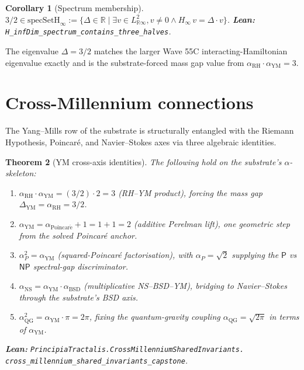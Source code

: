 \documentclass[11pt,a4paper]{article}
\theoremstyle{plain}
\newtheorem{theorem}{Theorem}[section]
\newtheorem{corollary}[theorem]{Corollary}
\theoremstyle{definition}
\begin{document}
\begin{corollary}[Spectrum membership]
\label{cor:spectrum}
$3/2 \in \mathrm{specSetH}_{\infty} :=
\{\Delta \in \mathbb{R} \mid \exists v \in L^{2}_{\mathbb{R}\infty},
v \ne 0 \wedge H_{\infty}\,v = \Delta \cdot v\}$.
\textbf{Lean:}
\texttt{H\_infDim\_spectrum\_contains\_three\_halves}.
\end{corollary}

The eigenvalue $\Delta = 3/2$ matches the larger Wave 55C
interacting-Hamiltonian eigenvalue exactly and is the
substrate-forced mass gap value from
$\alpha_{\mathrm{RH}} \cdot \alpha_{\mathrm{YM}} = 3$.

\section{Cross-Millennium connections}

The Yang--Mills row of the substrate is structurally entangled
with the Riemann Hypothesis, Poincar\'e, and Navier--Stokes axes
via three algebraic identities.

\begin{theorem}[YM cross-axis identities]
\label{thm:crossaxis}
The following hold on the substrate's $\alpha$-skeleton:
\begin{enumerate}[label=(\textbf{C\arabic*}),leftmargin=*]
\item $\alpha_{\mathrm{RH}} \cdot \alpha_{\mathrm{YM}} =
(3/2) \cdot 2 = 3$ (RH--YM product), forcing the mass gap
$\Delta_{\mathrm{YM}} = \alpha_{\mathrm{RH}} = 3/2$.
\item $\alpha_{\mathrm{YM}} = \alpha_{\mathrm{Poincar\acute e}} + 1
= 1 + 1 = 2$ (additive Perelman lift), one geometric step from
the solved Poincar\'e anchor.
\item $\alpha_{P}^{2} = \alpha_{\mathrm{YM}}$ (squared-Poincar\'e
factorisation), with $\alpha_{P} = \sqrt{2}$ supplying the
$\mathsf{P}$ vs $\mathsf{NP}$ spectral-gap discriminator.
\item $\alpha_{\mathrm{NS}} = \alpha_{\mathrm{YM}} \cdot
\alpha_{\mathrm{BSD}}$ (multiplicative NS--BSD--YM), bridging
to Navier--Stokes through the substrate's BSD axis.
\item $\alpha_{\mathrm{QG}}^{2} = \alpha_{\mathrm{YM}} \cdot \pi
= 2\pi$, fixing the quantum-gravity coupling
$\alpha_{\mathrm{QG}} = \sqrt{2\pi}$ in terms of
$\alpha_{\mathrm{YM}}$.
\end{enumerate}
\textbf{Lean:}
\texttt{PrincipiaTractalis.CrossMillenniumSharedInvariants.\\
cross\_millennium\_shared\_invariants\_capstone}.
\end{theorem}
\end{document}
